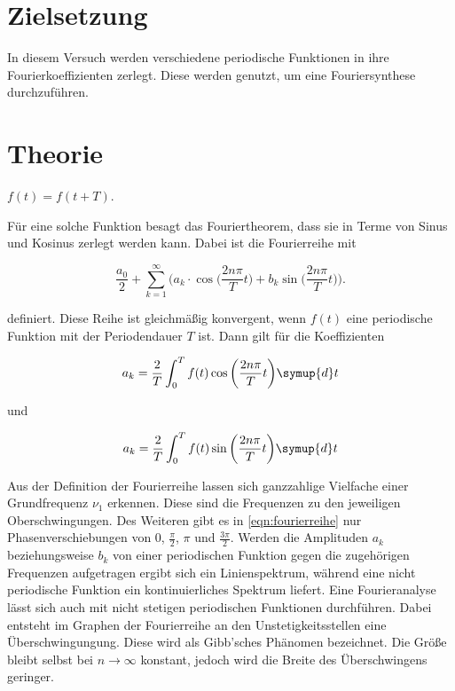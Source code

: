 \section{Zielsetzung}

In diesem Versuch werden verschiedene periodische Funktionen in ihre Fourierkoeffizienten zerlegt. Diese werden genutzt, um eine Fouriersynthese durchzuführen.

\section{Theorie}
\label{sec:Theorie}


\begin{center}
    $f(t) = f(t + T)$.
\end{center}

Für eine solche Funktion besagt das Fouriertheorem, dass sie in Terme von Sinus und Kosinus zerlegt werden kann.
Dabei ist die Fourierreihe mit

\begin{equation}
\label{eqn:fourierreihe}
    \frac{a_0}{2} + \sum_{k=1}^\infty \bigg( a_k \cdot \cos \bigg( \frac{2 n \pi}{T} t \bigg) + b_k \sin \bigg( \frac{2 n \pi}{T} t \bigg) \bigg).
\end{equation}

definiert. Diese Reihe ist gleichmäßig konvergent, wenn $f(t)$ eine periodische Funktion mit der Periodendauer $T$ ist. Dann gilt für die Koeffizienten

\begin{equation}
\label{eqn:ak}
    a_k = \frac{2}{T} \int_0^T f(t) \cos \bigg( \frac{2 n \pi}{T} t \bigg) \symup{d}t
\end{equation}

und

\begin{equation}
\label{eqn:bk}
    a_k = \frac{2}{T} \int_0^T f(t) \sin \bigg( \frac{2 n \pi}{T} t \bigg) \symup{d}t
\end{equation}


Aus der Definition der Fourierreihe lassen sich ganzzahlige Vielfache einer Grundfrequenz $\nu_1$ erkennen. Diese sind die Frequenzen zu den jeweiligen Oberschwingungen.
Des Weiteren gibt es in \eqref{eqn:fourierreihe} nur Phasenverschiebungen von $0$, $\frac{\pi}{2}$, $\pi$ und $\frac{3 \pi}{2}$.
Werden die Amplituden $a_k$ beziehungsweise $b_k$ von einer periodischen Funktion gegen die zugehörigen Frequenzen aufgetragen ergibt sich ein Linienspektrum, während eine nicht periodische Funktion ein kontinuierliches Spektrum liefert.
Eine Fourieranalyse lässt sich auch mit nicht stetigen periodischen Funktionen durchführen. Dabei entsteht im Graphen der Fourierreihe an den Unstetigkeitsstellen eine Überschwingungung. Diese wird als Gibb'sches Phänomen bezeichnet. Die Größe bleibt selbst bei $n \rightarrow \infty$ konstant, jedoch wird die Breite des Überschwingens geringer.

